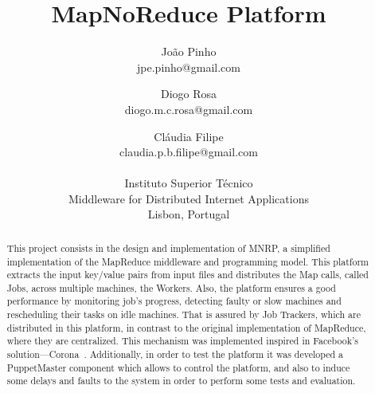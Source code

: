 \documentclass[times, 10pt,twocolumn]{article}
\begin{document}
	\title{MapNoReduce Platform}
	
	\author{
        João Pinho\\jpe.pinho@gmail.com\and Diogo Rosa\\
        diogo.m.c.rosa@gmail.com\and Cláudia Filipe\\
        claudia.p.b.filipe@gmail.com\\\\		 
		Instituto Superior Técnico\\
        Middleware for Distributed Internet Applications\\
        Lisbon, Portugal
    }
	\maketitle
	\thispagestyle{empty}
	
    
	\begin{abstract}
		This project consists in the design and implementation of \ac{MNRP}, a simplified implementation of the MapReduce middleware and programming model. This platform extracts the input key/value pairs from input files and distributes the Map calls, called Jobs, across multiple machines, the Workers. 
		Also, the platform ensures a good performance by monitoring job's progress, detecting faulty or slow machines and rescheduling their tasks on idle machines. That is assured by Job Trackers, which are distributed in this platform, in contrast to the original implementation of MapReduce, where they are centralized. This mechanism was implemented inspired in Facebook's solution—Corona~\cite{ChingFacebook2012}. 
		Additionally, in order to test the platform it was developed a PuppetMaster component which allows to control the platform, and also to induce some delays and faults to the system in order to perform some tests and evaluation.
	\end{abstract}
    
\end{document}
